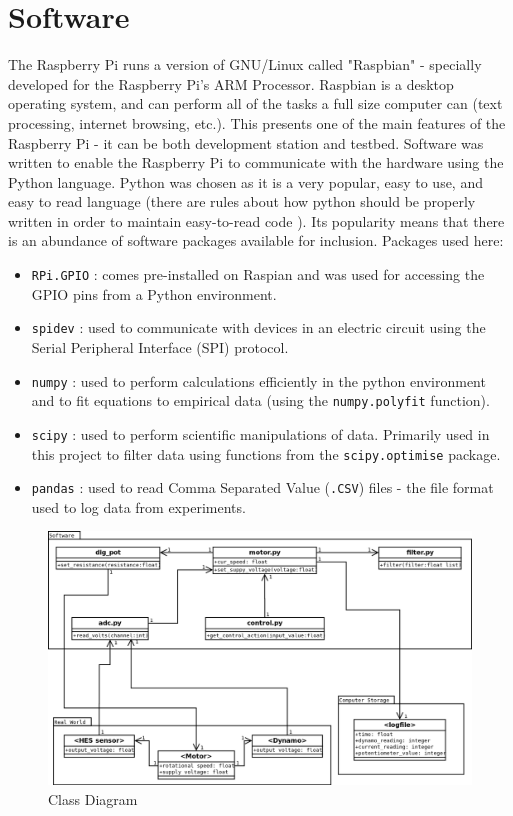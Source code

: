 \documentclass[twoside,a4]{report}
\def\br{\newline \newline \noindent}
\begin{document}
	\section{Software}
	The Raspberry Pi runs a version of GNU/Linux called "Raspbian" - specially developed for the Raspberry Pi's ARM Processor. Raspbian is a desktop operating system, and can perform all of the tasks a full size computer can (text processing, internet browsing, etc.). This presents one of the main features of the Raspberry Pi - it can be both development station and testbed. Software was written to enable the Raspberry Pi to communicate with the hardware using the Python language. Python was chosen as it is a very popular, easy to use, and easy to read language (there are rules about how python should be properly written in order to maintain easy-to-read code \cite{pep8ref}). Its popularity means that there is an abundance of software packages available for inclusion. 
	\br
	Packages used here:
	\begin{itemize}
		\item \texttt{RPi.GPIO} \cite{citerpigpio}: comes pre-installed on Raspian and was used for accessing the GPIO pins from a Python environment.
		\item \texttt{spidev} \cite{srcspidev}: used to communicate with devices in an electric circuit using the Serial Peripheral Interface (SPI) protocol.
		\item \texttt{numpy} \cite{numpyref}: used to perform calculations efficiently in the python environment and to fit equations to empirical data (using the \texttt{numpy.polyfit} function).
		\item \texttt{scipy} \cite{scipyref}: used to perform scientific manipulations of data. Primarily used in this project to filter data using functions from the \texttt{scipy.optimise} package.
		\item \texttt{pandas} \cite{pandasref}: used to read Comma Separated Value (\texttt{.CSV}) files - the file format used to log data from experiments.
	\end{itemize}
	
	\begin{figure}[!htb]
		\centering
		\includegraphics[scale=0.35]{images/codemap.png}
		\caption{Class Diagram}
		\label{figcladia}
	\end{figure}
	
\end{document}
